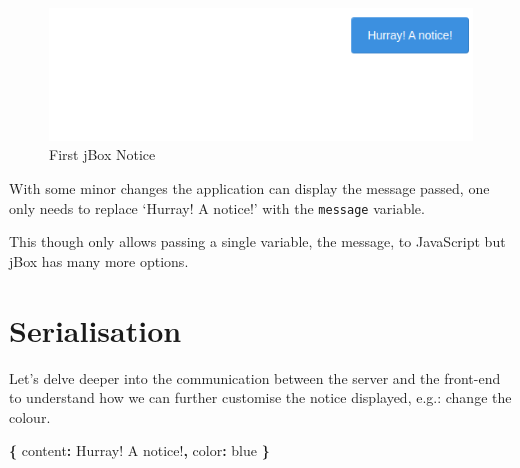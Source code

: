 \documentclass[
]{krantz}
\makeatletter
\newenvironment{Shaded}{\begin{snugshade}}{\end{snugshade}}
\newcommand{\DataTypeTok}[1]{\textcolor[rgb]{0.27,0.27,0.27}{#1}}
\newcommand{\KeywordTok}[1]{\textcolor[rgb]{0.27,0.27,0.27}{\textbf{#1}}}
\newcommand{\NormalTok}[1]{#1}
\newcommand{\OperatorTok}[1]{\textcolor[rgb]{0.43,0.43,0.43}{\textbf{#1}}}
\newcommand{\StringTok}[1]{\textcolor[rgb]{0.5,0.5,0.5}{#1}}
\newenvironment{kframe}{%
\medskip{}
\setlength{\fboxsep}{.8em}
 \def\at@end@of@kframe{}%
 \ifinner\ifhmode%
  \def\at@end@of@kframe{\end{minipage}}%
  \begin{minipage}{\columnwidth}%
 \fi\fi%
 \def\FrameCommand##1{\hskip\@totalleftmargin \hskip-\fboxsep
 \colorbox{shadecolor}{##1}\hskip-\fboxsep
     \hskip-\linewidth \hskip-\@totalleftmargin \hskip\columnwidth}%
 \MakeFramed {\advance\hsize-\width
   \@totalleftmargin\z@ \linewidth\hsize
   \@setminipage}}%
 {\par\unskip\endMakeFramed%
 \at@end@of@kframe}
\renewenvironment{Shaded}{\begin{kframe}}{\end{kframe}}
\makeatother
\begin{document}
\begin{figure}
\centering
\includegraphics{images/notice-1.png}
\caption{First jBox Notice}
\end{figure}

With some minor changes the application can display the message passed, one only needs to replace `Hurray! A notice!' with the \texttt{message} variable.

\begin{Shaded}
\end{Shaded}

This though only allows passing a single variable, the message, to JavaScript but jBox has many more options.

\hypertarget{serialisation}{%
\section*{Serialisation}\label{serialisation}}


Let's delve deeper into the communication between the server and the front-end to understand how we can further customise the notice displayed, e.g.: change the colour.

\begin{Shaded}
\begin{Highlighting}[]
\OperatorTok{\{}
  \DataTypeTok{content}\OperatorTok{:} \StringTok{\textquotesingle{}Hurray! A notice!\textquotesingle{}}\OperatorTok{,}
  \DataTypeTok{color}\OperatorTok{:} \StringTok{\textquotesingle{}blue\textquotesingle{}}
\OperatorTok{\}}
\end{Highlighting}
\end{Shaded}
\end{document}
